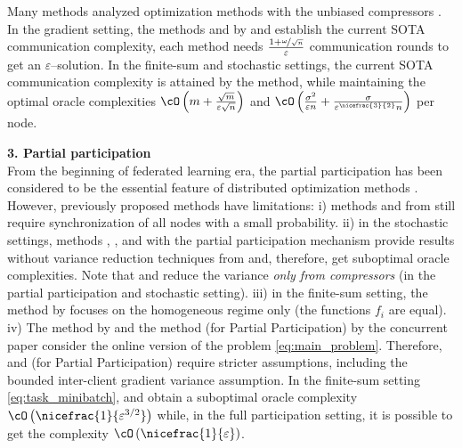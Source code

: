 \documentclass{article}
\begin{document}
Many methods analyzed optimization methods with the unbiased compressors \citep{alistarh2017qsgd, DIANA, horvath2019stochastic, MARINA, tyurin2022dasha}. In the gradient setting, the methods  and  by \cite{MARINA} and \cite{tyurin2022dasha} establish the current SOTA communication complexity, each method needs $\frac{1 + \nicefrac{\omega}{\sqrt{n}}}{\varepsilon}$ communication rounds to get an $\varepsilon$--solution. In the finite-sum and stochastic settings, the current SOTA communication complexity is attained by the  method, while maintaining the optimal oracle complexities $\cO\left(m + \frac{\sqrt{m}}{\varepsilon \sqrt{n}}\right)$ and $\cO\left(\frac{\sigma^2}{\varepsilon n} + \frac{\sigma}{\varepsilon^{\nicefrac{3}{2}} n}\right)$ per node.

\textbf{3. Partial participation} \\
From the beginning of federated learning era, the partial participation has been considered to be the essential feature of distributed optimization methods \citep{mcmahan2017communication, konevcny2016federated, kairouz2021advances}. 
However, previously proposed methods have limitations: i) methods  and  from \citep{MARINA, zhao2021fedpage} still require synchronization of all nodes with a small probability. ii) in the stochastic settings, methods , , and  with the partial participation mechanism \citep{mcmahan2017communication, karimireddy2020scaffold, zhao2021faster} provide results without variance reduction techniques from \citep{SPIDER, PAGE, cutkosky2019momentum} and, therefore, get suboptimal oracle complexities. Note that  and  reduce the variance \textit{only from compressors} (in the partial participation and stochastic setting). iii) in the finite-sum setting, the  method by \cite{li2021zerosarah} focuses on the homogeneous regime only (the functions $f_i$ are equal). iv) The  method by \cite{karimireddy2020mime} and the  method (for Partial Participation) by the concurrent paper \citep{pateltowards} consider the online version of the problem \eqref{eq:main_problem}. Therefore,  and  (for Partial Participation) require stricter assumptions, including the bounded inter-client gradient variance assumption. In the finite-sum setting \eqref{eq:task_minibatch},  and  obtain a suboptimal oracle complexity $\cO\left(\nicefrac{1}{\varepsilon^{3/2}}\right)$ while, in the full participation setting, it is possible to get the complexity $\cO\left(\nicefrac{1}{\varepsilon}\right)$.
\end{document}
